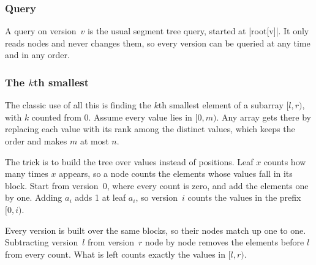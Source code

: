 \subsubsection{Query}
A query on version~\(v\) is the usual segment tree query, started at \code|root[v]|. It only reads nodes and never changes them, so every version can be queried at any time and in any order.

\subsubsection{The \(k\)th smallest}
The classic use of all this is finding the \(k\)th smallest element of a subarray \([l, r)\), with \(k\) counted from 0. Assume every value lies in \([0, m)\). Any array gets there by replacing each value with its rank among the distinct values, which keeps the order and makes \(m\) at most \(n\).

The trick is to build the tree over values instead of positions. Leaf \(x\) counts how many times \(x\) appears, so a node counts the elements whose values fall in its block. Start from version~0, where every count is zero, and add the elements one by one. Adding \(a_i\) adds 1 at leaf \(a_i\), so version~\(i\) counts the values in the prefix \([0, i)\).

\begin{center}
\end{center}

Every version is built over the same blocks, so their nodes match up one to one. Subtracting version~\(l\) from version~\(r\) node by node removes the elements before \(l\) from every count. What is left counts exactly the values in \([l, r)\).

